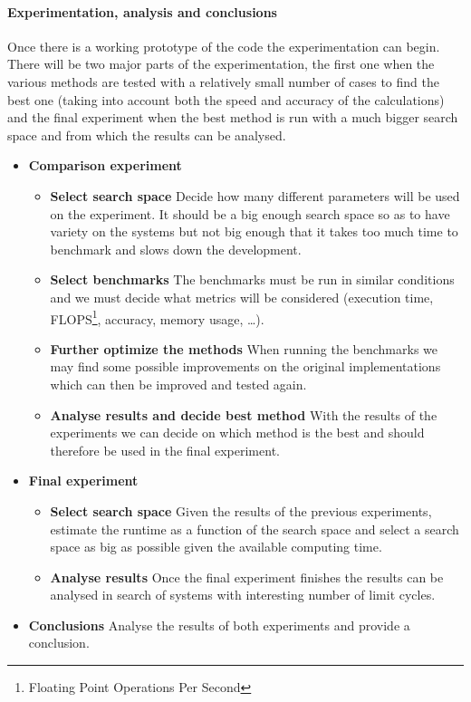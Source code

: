 \paragraph{Experimentation, analysis and conclusions}

Once there is a working prototype of the code the experimentation can begin.
There will be two major parts of the experimentation, the first one when the
various methods are tested with a relatively small number of cases to find the
best one (taking into account both the speed and accuracy of the calculations)
and the final experiment when the best method is run with a much bigger search
space and from which the results can be analysed.

\begin{itemize}
    \item \textbf{Comparison experiment}
        \begin{itemize}
            \item \textbf{Select search space} Decide how many different
                parameters will be used on the experiment. It should be a big
                enough search space so as to have variety on the systems but not
                big enough that it takes too much time to benchmark and slows
                down the development.
            \item \textbf{Select benchmarks} The benchmarks must be run in
                similar conditions and we must decide what metrics will be
                considered (execution time, FLOPS\footnote{Floating Point Operations
                Per Second}, accuracy, memory usage, \dots).
            \item \textbf{Further optimize the methods} When running the
                benchmarks we may find some possible improvements on the
                original implementations which can then be improved and tested
                again.
            \item \textbf{Analyse results and decide best method} With the
                results of the experiments we can decide on which method is the
                best and should therefore be used in the final experiment.
        \end{itemize}
    \item \textbf{Final experiment}
        \begin{itemize}
            \item \textbf{Select search space} Given the results of the previous
                experiments, estimate the runtime as a function of the search
                space and select a search space as big as possible given the
                available computing time.
            \item \textbf{Analyse results} Once the final experiment finishes
                the results can be analysed in search of systems with
                interesting number of limit cycles.
        \end{itemize}
    \item \textbf{Conclusions} Analyse the results of both experiments and
        provide a conclusion.
\end{itemize}

